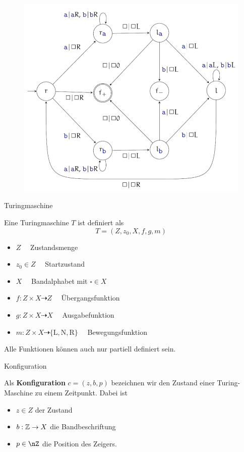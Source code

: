 \begin{frame}
	\vspace{-30pt}
	\begin{figure}[H]
		\centering
		\includegraphics[scale=0.45]{turing/Palindrom}
	\end{figure}
\end{frame}

\begin{frame}{Turingmaschine}
	\begin{Definition}
		Eine Turingmaschine $T$ ist definiert als $$ T = (Z, z_0 , X, f,g, m)$$
		\begin{itemize}[<+->]
			\item $Z \quad$ Zustandsmenge 
			\item $z_0\in Z \quad$ Startzustand
			\item $X \quad$ Bandalphabet mit $\square \in X$
			\item $f:Z\times X \dashrightarrow Z \quad$ Übergangsfunktion
			\item $g:Z\times X\dashrightarrow X \quad$ Ausgabefunktion 
			\item $m:Z\times X \dashrightarrow \{\text{L},\text{N},\text{R}\} \quad$ Bewegungsfunktion
		\end{itemize}
		\pause
		Alle Funktionen können auch nur partiell definiert sein.
	\end{Definition}
\end{frame}


\begin{frame}{Konfiguration}
	\begin{Definition}
		Als \textbf{Konfiguration} $ c =(z,b,p)$ bezeichnen wir den Zustand einer Turing-Maschine zu einem Zeitpunkt. Dabei ist 
		\begin{itemize}
			\item $z\in Z$ der Zustand
			\item $b: \mathbb{Z}\to X$ die Bandbeschriftung
			\item $p\in \nZ$ die Position des Zeigers.
		\end{itemize}
	\end{Definition}
\end{frame}


